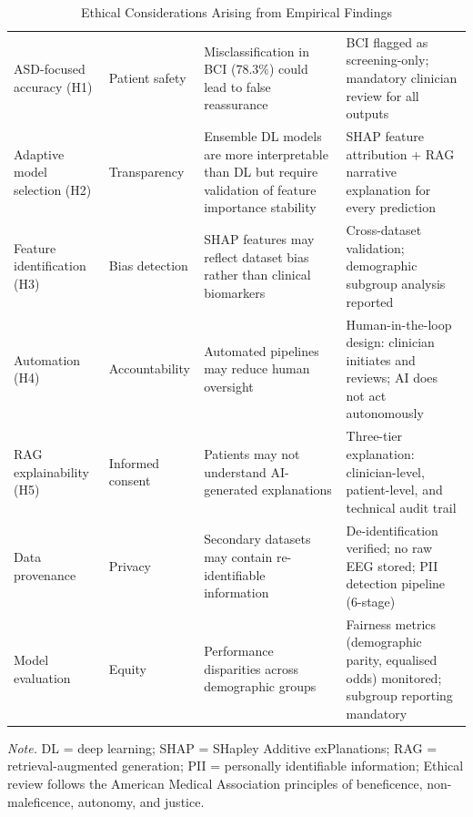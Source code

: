 \begin{table}[!htbp]
\tablestripes\tablefontsize
\caption{Ethical Considerations Arising from Empirical Findings}
\tablefontsize
\begin{tabularx}{\textwidth}{@{} >{\raggedright\arraybackslash}p{2.0cm} >{\raggedright\arraybackslash}p{2.3cm} L L @{}}
\toprule
{} &  &  &  \\
\midrule
ASD-focused accuracy (H1) & Patient safety & Misclassification in BCI (78.3\%) could lead to false reassurance & BCI flagged as screening-only; mandatory clinician review for all outputs \\
\addlinespace
Adaptive model selection (H2) & Transparency & Ensemble DL models are more interpretable than DL but require validation of feature importance stability & SHAP feature attribution + RAG narrative explanation for every prediction \\
\addlinespace
Feature identification (H3) & Bias detection & SHAP features may reflect dataset bias rather than clinical biomarkers & Cross-dataset validation; demographic subgroup analysis reported \\
\addlinespace
Automation (H4) & Accountability & Automated pipelines may reduce human oversight & Human-in-the-loop design: clinician initiates and reviews; AI does not act autonomously \\
\addlinespace
RAG explainability (H5) & Informed consent & Patients may not understand AI-generated explanations & Three-tier explanation: clinician-level, patient-level, and technical audit trail \\
\addlinespace
Data provenance & Privacy & Secondary datasets may contain re-identifiable information & De-identification verified; no raw EEG stored; PII detection pipeline (6-stage) \\
\addlinespace
Model evaluation & Equity & Performance disparities across demographic groups & Fairness metrics (demographic parity, equalised odds) monitored; subgroup reporting mandatory \\
\bottomrule
\end{tabularx}
\vspace{0.5em}\noindent\textit{Note.} DL = deep learning; SHAP = SHapley Additive exPlanations; RAG = retrieval-augmented generation; PII = personally identifiable information;  Ethical review follows the American Medical Association principles of beneficence, non-maleficence, autonomy, and justice.
\end{table}
\fi %


